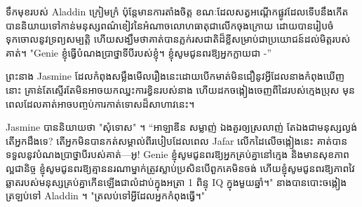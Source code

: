 ទឹកមុខរបស់ Aladdin ក្រៀមក្រំ ប៉ុន្តែមានការតាំងចិត្ត ខណៈដែលសត្វអណ្តើកផ្លូវដែលទើបនឹងកើតបាននិយាយទៅកាន់មនុស្សពណ៌ខៀវនៃអំណាចលោហធាតុជាលើកចុងក្រោយ ដោយបានរៀបចំទុកចោលនូវទ្រព្យសម្បត្តិ ហើយសង្ឃឹមថាគាត់បានភ្លក់រសជាតិដ៏ខ្លីសម្រាប់ជាប្រយោជន៍ដល់មិត្តរបស់គាត់។ "Genie ខ្ញុំធ្វើបំណងប្រាថ្នាទីបីរបស់ខ្ញុំ។ ខ្ញុំសូមជូនពរឱ្យអ្នកក្លាយជា -”

ព្រះនាង Jasmine ដែលកំពុងសម្លឹងមើលរឿងនេះដោយបើកមាត់មិនជឿនូវអ្វីដែលនាងកំពុងឃើញនោះ គ្រាន់តែស្ទើរតែមិនអាចយកឈ្នះការខ្វិនរបស់នាង ហើយដកចង្កៀងចេញពីដៃរបស់ក្មេងប្រុស មុនពេលដែលគាត់អាចបញ្ចប់ការកាត់ទោសដ៏សាហាវនេះ។

Jasmine បាននិយាយថា "សុំទោស" ។ “អាឡាឌីន សម្លាញ់ ឯងគួរឲ្យស្រលាញ់ តែឯងជាមនុស្សល្ងង់ តើអ្នកដឹងទេ? តើ​អ្នក​មិន​បាន​កត់​សម្គាល់​ពី​របៀប​ដែល​ពេល Jafar លើក​ដៃ​លើ​ចង្កៀង​នេះ គាត់​បាន​ទទួល​នូវ​បំណង​ប្រាថ្នា​បី​របស់​គាត់—អូ! Genie ខ្ញុំសូមជូនពរឱ្យអ្នកគ្រប់គ្នានៅក្មេង និងមានសុខភាពល្អជានិច្ច ខ្ញុំសូមជូនពរឱ្យគ្មាននរណាម្នាក់ត្រូវស្លាប់ប្រសិនបើពួកគេមិនចង់ ហើយខ្ញុំសូមជូនពរឱ្យភាពវៃឆ្លាតរបស់មនុស្សគ្រប់គ្នាកើនឡើងជាលំដាប់ក្នុងអត្រា 1 ពិន្ទុ IQ ក្នុងមួយឆ្នាំ។" នាងបានបោះចង្កៀងត្រឡប់ទៅ Aladdin ។ "ត្រលប់ទៅអ្វីដែលអ្នកកំពុងធ្វើ។"

%

